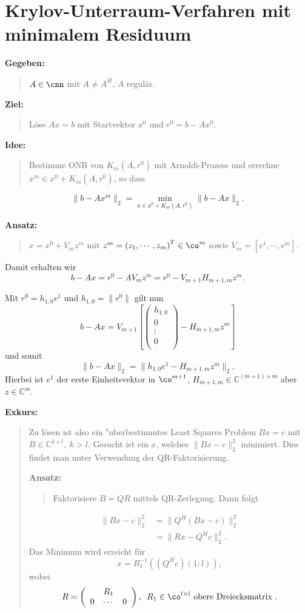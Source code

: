 \section[KUV mit minimalem Residuum]{Krylov-Unterraum-Verfahren mit minimalem Residuum}

{\bf Gegeben: }
\begin{quote}
$A \in \cnn$ mit $A \neq A^H$,  $A$ regul\"ar.
\end{quote}
{\bf Ziel: }
\begin{quote}
L\"ose $Ax = b$ mit Startvektor $x^0$ und $r^0 = b-Ax^0$.
\end{quote}
{\bf Idee:}
\begin{quote}
Bestimme ONB von $K_m(A,r^0)$ mit Arnoldi-Prozess und errechne $x^m \in x^0 + K_m(A,r^0)$, so dass
\end{quote}
\[
\|b-Ax^m\|_2 = \underset{x \in x^0 + K_m(A,r^0)}{\min} \|b-Ax\|_2.
\]

{\bf Ansatz:}
\begin{quote}
$x = x^0 + V_m z^m$ mit $z^m = \left(z_1,\cdots,z_m\right)^T \in \co^m$ sowie
$V_m = \left[ v^1,\cdots,v^m \right]$.
\end{quote}

Damit erhalten wir
\[
b - Ax = r^0 - AV_m z^m = r^0 - V_{m+1}H_{m+1,m}z^m.
\]

Mit $r^0 = h_{1,0} v^1$ und $h_{1,0} = \|r^0\|$ gilt nun
\[
b-Ax = V_{m+1} \left[
\left(%
\begin{array}{c}
  h_{1,0} \\
  0 \\
  \vdots \\
  0 \\
\end{array}%
\right) - H_{m+1,m} z^m \right]
\]
und somit
\[
\|b-Ax\|_2 = \|h_{1,0}e^1 - H_{m+1,m}z^m\|_2.
\]
Hierbei ist $e^1$ der erste Einheitsvektor in $\co^{m+1}$,
$H_{m+1,m} \in \mathbb{C}^{(m+1)\times m}$
aber $z \in \mathbb{C}^m$.

\clearpage

{\bf Exkurs:}

\begin{quote}
Zu l\"osen ist also ein "uberbestimmtes Least Squares Problem $Bx = c$ mit
$B\in \mathbb{C}^{k \times l}, \; k > l$. Gesucht ist
ein $x$, welches $\| Bx-c \|_2^2$ minimiert. Dies findet man unter Verwendung der
QR-Faktorisierung.

{\bf Ansatz:}
\begin{quote}
Faktorisiere $ B = QR$ mittels QR-Zerlegung. Dann folgt
\end{quote}
\begin{align*}
\|Bx-c\|_2^2 &= \|Q^H(Bx-c)\|_2^2\\
&= \|Rx - Q^Hc\|_2^2.
\end{align*}
Das Minimum wird erreicht f\"ur
\[
x = R_1^{-1}( (Q^Hc)(1:l) ),
\]
wobei
\[
R = \left(\begin{array}{ccc} & R_1 & \\
    0 & \cdots & 0 \end{array}
    \right), \enspace R_1 \in \co^{l\times l} \mbox{ obere Dreiecksmatrix }.
\]
\end{quote}

